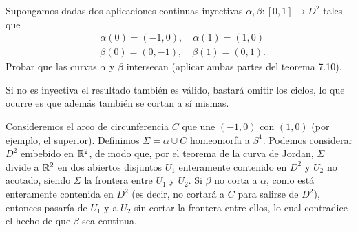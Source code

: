 \documentclass[twoside]{article}
\begin{document}
\newpage

\begin{ejercicio}{7.5}
Supongamos dadas dos aplicaciones continuas inyectivas $\alpha,\beta:[0,1]\to D^2$ tales que 
\begin{align*}
&\alpha(0)=(-1,0), \quad \alpha(1)=(1,0)\\
&\beta(0)=(0,-1), \quad \beta(1)=(0,1).
\end{align*}
Probar que las curvas $\alpha$ y $\beta$ intersecan (aplicar ambas partes del teorema 7.10). 
\end{ejercicio}
\begin{solucion}
Si no es inyectiva el resultado también es válido, bastará omitir los ciclos, lo que ocurre es que además también se cortan a sí mismas.

Consideremos el arco de circunferencia $C$ que une $(-1,0)$ con $(1,0)$ (por ejemplo, el superior). Definimos $\Sigma=\alpha\cup C$ homeomorfa a $S^1$. Podemos considerar $D^2$ embebido en $\mathbb{R}^2$, de modo que, por el teorema de la curva de Jordan, $\Sigma$ divide a $\mathbb{R}^2$ en dos abiertos disjuntos $U_1$ enteramente contenido en $D^2$ y $U_2$ no acotado, siendo $\Sigma$ la frontera entre $U_1$ y $U_2$. Si $\beta$ no corta a $\alpha$, como está enteramente contenida en $D^2$ (es decir, no cortará a $C$ para salirse de $D^2$), entonces pasaría de $U_1$ y a $U_2$ sin cortar la frontera entre ellos, lo cual contradice el hecho de que $\beta$ sea continua.
\end{solucion}
\end{document}

